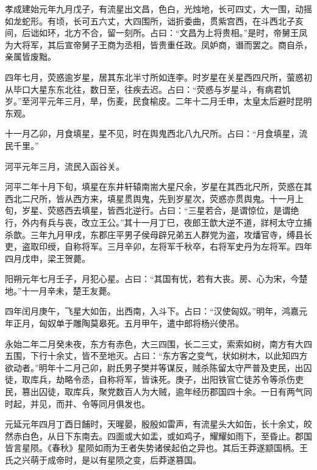 \documentclass[12pt,UTF8]{ctexbook}
\begin{document}
孝成建始元年九月戊子，有流星出文昌，色白，光烛地，长可四丈，大一围，动摇如龙蛇形。有顷，长可五六丈，大四围所，诎折委曲，贯紫宫西，在斗西北子亥间，后诎如环，北方不合，留一刻所。占曰：“文昌为上将贵相。”是时，帝舅王凤为大将军，其后宣帝舅子王商为丞相，皆贵重任政。凤妒商，谮而罢之。商自杀，亲属皆废黜。



四年七月，荧惑逾岁星，居其东北半寸所如连李。时岁星在关星西四尺所，萤惑初从毕口大星东东北往，数日至，往疾去迟。占曰：“荧惑与岁星斗，有病君饥岁。”至河平元年三月，旱，伤麦，民食榆皮。二年十二月壬申，太皇太后避时昆明东观。



十一月乙卯，月食填星，星不见，时在舆鬼西北八九尺所。占曰：“月食填星，流民千里。”



河平元年三月，流民入函谷关。



河平二年十月下旬，填星在东井轩辕南耑大星尺余，岁星在其西北尺所，荧惑在其西北二尺所，皆从西方来，填星贯舆鬼，先到岁星次，荧惑亦贯舆鬼。十一月上旬，岁星、荧惑西去填星，皆西北逆行。占曰：“三星若合，是谓惊位，是谓绝行，外内有兵与丧，改立王公。”其十一月丁巳，夜郎王歆大逆不道，牂柯太守立捕杀歆。三年九月甲戌，东郡庄平男子侯母辟兄弟五人群党为盗，攻燔官寺，缚县长吏，盗取印绶，自称将军。三月辛卯，左将军千秋卒，右将军史丹为左将军。四年四月戊申，梁王贺薨。



阳朔元年七月壬子，月犯心星。占曰：“其国有忧，若有大丧。房、心为宋，今楚地。”十一月辛未，楚王友薨。



四年闰月庚午，飞星大如缶，出西南，入斗下。占曰：“汉使匈奴。”明年，鸿嘉元年正月，匈奴单于雕陶莫皋死。五月甲午，遣中郎将杨兴使吊。



永始二年二月癸未夜，东方有赤色，大三四围，长二三丈，索索如树，南方有大四五围，下行十余丈，皆不至地灭。占曰：“东方客之变气，状如树木，以此知四方欲动者。”明年十二月己卯，尉氏男子樊并等谋反，贼杀陈留太守严普及吏民，出囚徒，取库兵，劫略令丞，自称将军，皆诛死。庚子，出阳铁官亡徒苏令等杀伤吏民，篡出囚徒，取库兵，聚党数百人为大贼，逾年经历郡国四十余。一日有两气同时起，并见，而并、令等同月俱发也。



元延元年四月丁酉日餔时，天暒晏，殷殷如雷声，有流星头大如缶，长十余丈，皎然赤白色，从日下东南去。四面或大如盂，或如鸡子，耀耀如雨下，至昏止。郡国皆言星陨。《春秋》星陨如雨为王者失势诸侯起伯之异也。其后王莽遂颛国柄。王氏之兴萌于成帝时，是以有星陨之变，后莽遂篡国。
\end{document}
